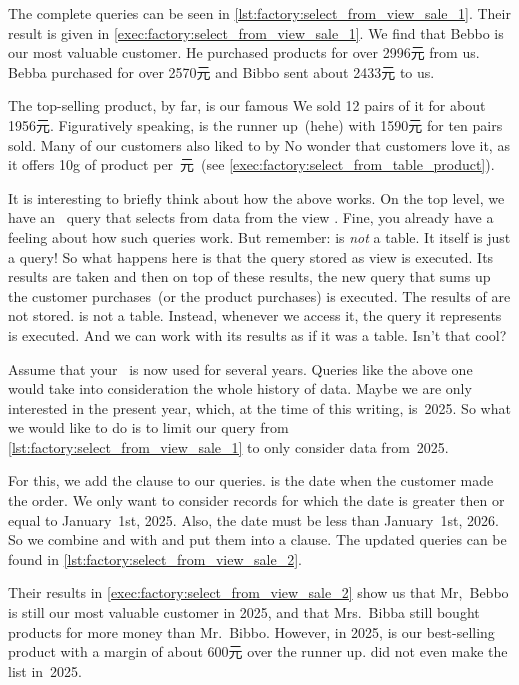 The complete queries can be seen in \cref{lst:factory:select_from_view_sale_1}.
Their result is given in \cref{exec:factory:select_from_view_sale_1}.
We find that Bebbo is our most valuable customer.
He purchased products for over 2996元 from us.
Bebba purchased for over 2570元 and Bibbo sent about 2433元 to us.

The top-selling product, by far, is our famous 
We sold 12 pairs of it for about 1956元.
Figuratively speaking,  is the runner up~(hehe) with 1590元 for ten pairs sold.
Many of our customers also liked to by 
No wonder that customers love it, as it offers 10g of product per~元~(see \cref{exec:factory:select_from_table_product}).

It is interesting to briefly think about how the above works.
On the top level, we have an \sql\ query that selects from data from the view .
Fine, you already have a feeling about how such queries work.
But remember:  is \emph{not} a table.
It itself is just a query!
So what happens here is that the query stored as view  is executed.
Its results are taken and then on top of these results, the new query that sums up the customer purchases~(or the product purchases) is executed.
The results of  are not stored.
 is not a table.
Instead, whenever we access it, the query it represents is executed.
And we can work with its results as if it was a table.
Isn't that cool?

Assume that your \db\ is now used for several years.
Queries like the above one would take into consideration the whole history of data.
Maybe we are only interested in the present year, which, at the time of this writing, is~2025.
So what we would like to do is to limit our query from \cref{lst:factory:select_from_view_sale_1} to only consider data from~2025.%
%
\begin{sloppypar}%
For this, we add the clause  to our queries.
 is the date when the customer made the order.
We only want to consider records for which the date is greater then or equal to January~1st, 2025.
Also, the date must be less than January~1st, 2026.
So we combine  and  with  and put them into a  clause.
The updated queries can be found in \cref{lst:factory:select_from_view_sale_2}.%
\end{sloppypar}%
%
Their results in \cref{exec:factory:select_from_view_sale_2} show us that Mr,~Bebbo is still our most valuable customer in 2025, and that Mrs.~Bibba still bought products for more money than Mr.~Bibbo.
However, in 2025,  is our best-selling product with a margin of about 600元 over the runner up.
 did not even make the list in~2025.

